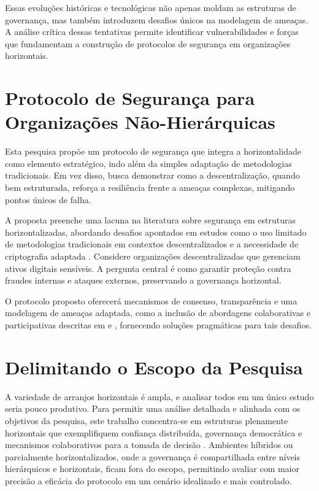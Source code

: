 Essas evoluções históricas e tecnológicas não apenas moldam as estruturas
de governança, mas também introduzem desafios únicos na modelagem de
ameaças. A análise crítica dessas tentativas permite identificar
vulnerabilidades e forças que fundamentam a construção de protocolos de
segurança em organizações horizontais.

\section{Protocolo de Segurança para Organizações Não-Hierárquicas}
\label{sec:objetivos_pesquisa}

Esta pesquisa propõe um protocolo de segurança que integra a
horizontalidade como elemento estratégico, indo além da simples adaptação
de metodologias tradicionais. Em vez disso, busca demonstrar como a
descentralização, quando bem estruturada, reforça a resiliência frente a
ameaças complexas, mitigando pontos únicos de falha.

A proposta preenche uma lacuna na literatura sobre segurança em estruturas
horizontalizadas, abordando desafios apontados em estudos como o uso
limitado de metodologias tradicionais em contextos descentralizados
\cite{ThreatModellingSurvey} e a necessidade de criptografia adaptada
\cite{Colbac}. Considere organizações descentralizadas que gerenciam ativos
digitais sensíveis. A pergunta central é como garantir proteção contra
fraudes internas e ataques externos, preservando a governança horizontal.

O protocolo proposto oferecerá mecanismos de consenso, transparência e uma
modelagem de ameaças adaptada, como a inclusão de abordagens colaborativas
e participativas descritas em \cite{Colbac} e \cite{AbcCrypto}, fornecendo
soluções pragmáticas para tais desafios.


\section{Delimitando o Escopo da Pesquisa}
\label{sec:delimitacao_escopo}

A variedade de arranjos horizontais é ampla, e analisar todos em um único
estudo seria pouco produtivo. Para permitir uma análise detalhada e
alinhada com os objetivos da pesquisa, este trabalho concentra-se em
estruturas plenamente horizontais que exemplifiquem confiança distribuída,
governança democrática e mecanismos colaborativos para a tomada de decisão
\cite{Colbac}. Ambientes híbridos ou parcialmente horizontalizados, onde a
governança é compartilhada entre níveis hierárquicos e horizontais, ficam
fora do escopo, permitindo avaliar com maior precisão a eficácia do
protocolo em um cenário idealizado e mais controlado.

